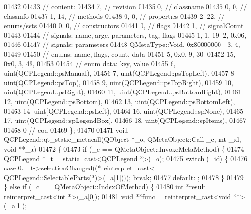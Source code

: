 \begin{DoxyCode}
01432 
01433  \textcolor{comment}{// content:}
01434        7,       \textcolor{comment}{// revision}
01435        0,       \textcolor{comment}{// classname}
01436        0,    0, \textcolor{comment}{// classinfo}
01437        1,   14, \textcolor{comment}{// methods}
01438        0,    0, \textcolor{comment}{// properties}
01439        2,   22, \textcolor{comment}{// enums/sets}
01440        0,    0, \textcolor{comment}{// constructors}
01441        0,       \textcolor{comment}{// flags}
01442        1,       \textcolor{comment}{// signalCount}
01443 
01444  \textcolor{comment}{// signals: name, argc, parameters, tag, flags}
01445        1,    1,   19,    2, 0x06,
01446 
01447  \textcolor{comment}{// signals: parameters}
01448     QMetaType::Void, 0x80000000 | 3,    4,
01449 
01450  \textcolor{comment}{// enums: name, flags, count, data}
01451        5, 0x0,    9,   30,
01452       15, 0x0,    3,   48,
01453 
01454  \textcolor{comment}{// enum data: key, value}
01455        6, uint(QCPLegend::psManual),
01456        7, uint(QCPLegend::psTopLeft),
01457        8, uint(QCPLegend::psTop),
01458        9, uint(QCPLegend::psTopRight),
01459       10, uint(QCPLegend::psRight),
01460       11, uint(QCPLegend::psBottomRight),
01461       12, uint(QCPLegend::psBottom),
01462       13, uint(QCPLegend::psBottomLeft),
01463       14, uint(QCPLegend::psLeft),
01464       16, uint(QCPLegend::spNone),
01465       17, uint(QCPLegend::spLegendBox),
01466       18, uint(QCPLegend::spItems),
01467 
01468        0        \textcolor{comment}{// eod}
01469 \};
01470 
01471 \textcolor{keywordtype}{void} QCPLegend::qt\_static\_metacall(QObject *\_o, QMetaObject::Call \_c, \textcolor{keywordtype}{int} \_id, \textcolor{keywordtype}{void} **\_a)
01472 \{
01473     \textcolor{keywordflow}{if} (\_c == QMetaObject::InvokeMetaMethod) \{
01474         QCPLegend *\_t = \textcolor{keyword}{static\_cast<}QCPLegend *\textcolor{keyword}{>}(\_o);
01475         \textcolor{keywordflow}{switch} (\_id) \{
01476         \textcolor{keywordflow}{case} 0: \_t->selectionChanged((*\textcolor{keyword}{reinterpret\_cast<} QCPLegend::SelectableParts(*)\textcolor{keyword}{>}(\_a[1]))); \textcolor{keywordflow}{break};
01477         \textcolor{keywordflow}{default}: ;
01478         \}
01479     \} \textcolor{keywordflow}{else} \textcolor{keywordflow}{if} (\_c == QMetaObject::IndexOfMethod) \{
01480         \textcolor{keywordtype}{int} *result = \textcolor{keyword}{reinterpret\_cast<}\textcolor{keywordtype}{int} *\textcolor{keyword}{>}(\_a[0]);
01481         \textcolor{keywordtype}{void} **func = \textcolor{keyword}{reinterpret\_cast<}\textcolor{keywordtype}{void} **\textcolor{keyword}{>}(\_a[1]);

\end{DoxyCode}
